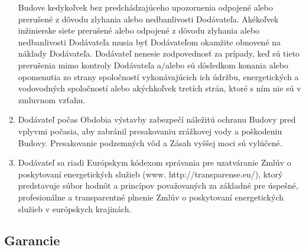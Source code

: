 \begin{multicols}{2}
\begin{enumerate}
  Budove kedykoľvek bez predchádzajúceho upozornenia odpojené alebo
  prerušené z dôvodu zlyhania alebo nedbanlivosti Dodávateľa. Akékoľvek
  inžinierske siete prerušené alebo odpojené z dôvodu zlyhania alebo
  nedbanlivosti Dodávateľa musia byť Dodávateľom okamžite obnovené na
  náklady Dodávateľa. Dodávateľ nenesie zodpovednosť za prípady, keď sú
  tieto prerušenia mimo kontroly Dodávateľa a/alebo sú dôsledkom konania
  alebo opomenutia zo strany spoločností vykonávajúcich ich údržbu,
  energetických a vodovodných spoločností alebo akýchkoľvek tretích
  strán, ktoré s ním nie sú v zmluvnom vzťahu.
\item
  Dodávateľ počas Obdobia výstavby zabezpečí náležitú ochranu Budovy
  pred vplyvmi počasia, aby zabránil presakovaniu zrážkovej vody a
  poškodeniu Budovy. Presakovanie podzemných vôd a Zásah vyššej moci sú
  vylúčené.
\item
  Dodávateľ sa riadi Európskym kódexom správania pre uzatváranie Zmlúv o
  poskytovaní energetických služieb (www. http://transparense.eu/),
  ktorý predstavuje súbor hodnôt a princípov považovaných za základné
  pre úspešné, profesionálne a transparentné plnenie Zmlúv o poskytovaní
  energetických služieb v európskych krajinách.
\end{enumerate}

\subsection{Garancie}


\end{multicols}
